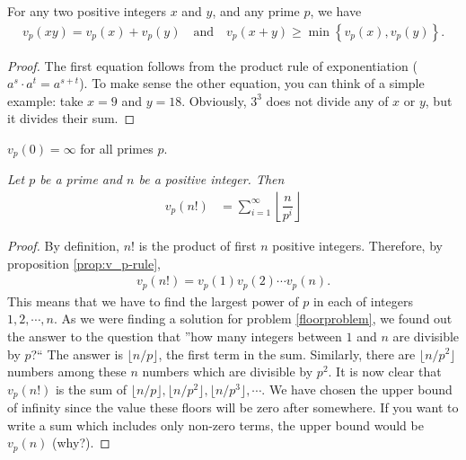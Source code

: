 \documentclass[12pt]{subfile}
\begin{document}
\begin{proposition} \label{prop:v_p-rule}
	For any two positive integers $x$ and $y$, and any prime $p$, we have
		\begin{align*}
		v_p(xy)=v_p(x)+v_p(y) \quad \text{and} \quad v_p(x+y)\geq\min\left\{v_p(x),v_p(y)\right\}.
		\end{align*}
\end{proposition}

\begin{proof}
	The first equation follows from the product rule of exponentiation ($a^{s} \cdot a^{t} = a^{s+t}$). To make sense the other equation, you can think of a simple example: take $x=9$ and $y=18$. Obviously, $3^3$ does not divide any of $x$ or $y$, but it divides their sum.
\end{proof}

\begin{note}
	$v_p(0)=\infty$ for all primes $p.$
\end{note}

\begin{theorem}\label{thm:legendre}\slshape
	Let $p$ be a prime and $n$ be a positive integer. Then
		\begin{align*}
		v_p(n!) & =\sum_{i=1}^{\infty}\left\lfloor\dfrac{n}{p^i}\right\rfloor
		\end{align*}
\end{theorem}

\begin{proof}
	By definition, $n!$ is the product of first $n$ positive integers. Therefore, by proposition \eqref{prop:v_p-rule},
		\begin{align*}
			v_p(n!) = v_p(1) v_p(2) \cdots v_p(n).
		\end{align*}
	This means that we have to find the largest power of $p$ in each of integers $1,2,\cdots, n$. As we were finding a solution for problem \eqref{floorproblem}, we found out the answer to the question that ''how many integers between $1$ and $n$ are divisible by $p$?`` The answer is $\lfloor n/p \rfloor$, the first term in the sum. Similarly, there are $\lfloor n/p^2 \rfloor$ numbers among these $n$ numbers which are divisible by $p^2$. It is now clear that $v_p(n!)$ is the sum of $\lfloor n/p \rfloor, \lfloor n/p^2 \rfloor, \lfloor n/p^3 \rfloor, \cdots$. We have chosen the upper bound of infinity since the value these floors will be zero after somewhere. If you want to write a sum which includes only non-zero terms, the upper bound would be $v_p(n)$ (why?).
\end{proof}
\end{document}
